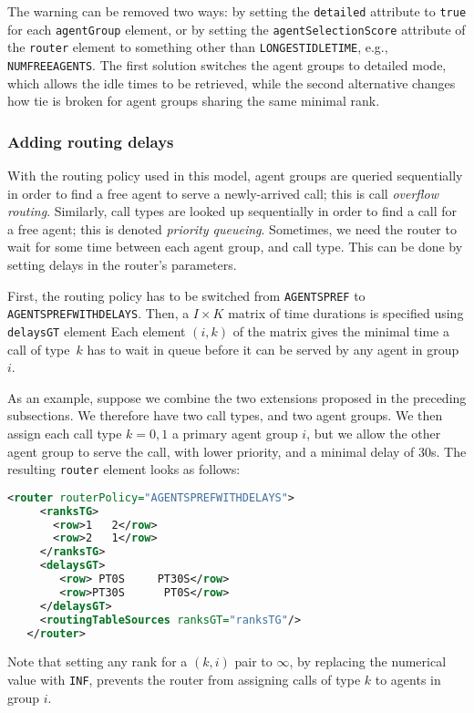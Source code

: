 The warning can be removed two ways: by setting the
\texttt{detailed} attribute to \texttt{true}
for each \texttt{agent\-Group} element, or by
setting the \texttt{agent\-Selection\-Score} attribute of the
\texttt{router} element to something other than
\texttt{LONGESTIDLETIME}, e.g., \texttt{NUMFREEAGENTS}.
The first solution switches the agent groups to detailed mode, which
allows the idle times to be retrieved, while the second alternative
changes how tie is broken for agent groups sharing the same minimal
rank.

\subsubsection{Adding routing delays}

With the routing policy used in this model, agent groups are queried
sequentially in order to find a free agent to serve a newly-arrived
call; this is call \emph{overflow routing}.
Similarly, call types are looked up sequentially in order to find a
call for a free agent; this is denoted \emph{priority queueing}.
Sometimes, we need the router to wait for some time between each agent
group, and call type.  This can be done by setting delays in the
router's parameters.

First, the routing policy has to be switched from \texttt{AGENTSPREF}
to
\texttt{AGENTSPREFWITHDELAYS}.
Then, a $I\times K$ matrix of time durations is
specified using \texttt{delaysGT} element
Each element $(i, k)$ of the matrix gives the minimal time a call of
type~$k$ has to wait in queue before it can be served by any agent in
group~$i$.

As an example, suppose we combine the two extensions proposed in the
preceding subsections.  We therefore have two call types, and two
agent groups.
We then assign each call type $k=0,1$ a primary agent group $i$, but
we allow the other agent group to serve the call, with lower priority,
and a minimal delay of 30s.
The resulting \texttt{router} element looks as follows:
\begin{lstlisting}[language=XML]
   <router routerPolicy="AGENTSPREFWITHDELAYS">
     <ranksTG>
       <row>1   2</row>
       <row>2   1</row>
     </ranksTG>
     <delaysGT>
        <row> PT0S     PT30S</row>
        <row>PT30S      PT0S</row>
     </delaysGT>
     <routingTableSources ranksGT="ranksTG"/>
   </router>
\end{lstlisting}
Note that setting any rank for a $(k, i)$ pair
to $\infty$, by replacing the numerical
value with
\texttt{INF}, prevents the router from assigning
calls of type $k$ to agents in group $i$.

